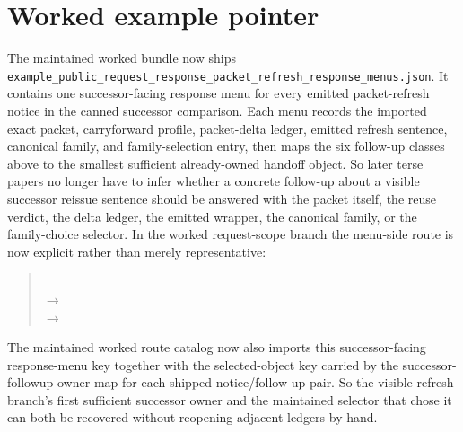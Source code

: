 \documentclass[11pt]{article}
\begin{document}
\section{Worked example pointer}
The maintained worked bundle now ships \nolinkurl{example_public_request_response_packet_refresh_response_menus.json}.\cite{series:workedexample}
It contains one successor-facing response menu for every emitted packet-refresh notice in the canned successor comparison.
Each menu records the imported exact packet, carryforward profile, packet-delta ledger, emitted refresh sentence, canonical family, and family-selection entry, then maps the six follow-up classes above to the smallest sufficient already-owned handoff object.
So later terse papers no longer have to infer whether a concrete follow-up about a visible successor reissue sentence should be answered with the packet itself, the reuse verdict, the delta ledger, the emitted wrapper, the canonical family, or the family-choice selector.
In the worked request-scope branch the menu-side route is now explicit rather than merely representative:
\begin{quote}\small\ttfamily
{}\\
$\to$ \\
$\to$ 
\end{quote}
The maintained worked route catalog now also imports this successor-facing response-menu key together with the selected-object key carried by the successor-followup owner map for each shipped notice/follow-up pair. So the visible refresh branch's first sufficient successor owner and the maintained selector that chose it can both be recovered without reopening adjacent ledgers by hand.
\end{document}
